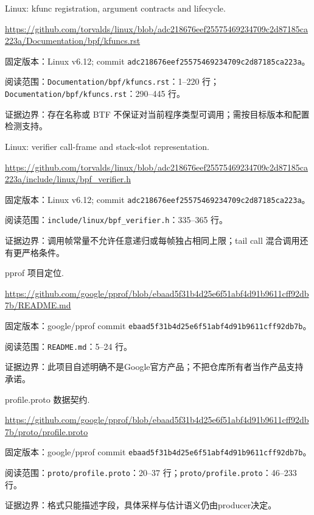 \documentclass[UTF8,fontset=fandol,openany,11pt]{ctexbook}
\begin{document}
\begin{thebibliography}{999}
 Linux: kfunc registration, argument contracts and lifecycle.\par
\url{https://github.com/torvalds/linux/blob/adc218676eef25575469234709c2d87185ca223a/Documentation/bpf/kfuncs.rst}\par
{\small\raggedright 固定版本：Linux v6.12; commit \texttt{adc21867\allowbreak{}6eef2557\allowbreak{}54692347\allowbreak{}09c2d871\allowbreak{}85ca223a}。\par
阅读范围：\nolinkurl{Documentation/bpf/kfuncs.rst}：1–220 行；\nolinkurl{Documentation/bpf/kfuncs.rst}：290–445 行。\par
证据边界：存在名称或 BTF 不保证对当前程序类型可调用；需按目标版本和配置检测支持。
}

 Linux: verifier call-frame and stack-slot representation.\par
\url{https://github.com/torvalds/linux/blob/adc218676eef25575469234709c2d87185ca223a/include/linux/bpf_verifier.h}\par
{\small\raggedright 固定版本：Linux v6.12; commit \texttt{adc21867\allowbreak{}6eef2557\allowbreak{}54692347\allowbreak{}09c2d871\allowbreak{}85ca223a}。\par
阅读范围：\nolinkurl{include/linux/bpf_verifier.h}：335–365 行。\par
证据边界：调用帧常量不允许任意递归或每帧独占相同上限；tail call 混合调用还有更严格条件。
}

 pprof 项目定位.\par
\url{https://github.com/google/pprof/blob/ebaad5f31b4d25e6f51abf4d91b9611cff92db7b/README.md}\par
{\small\raggedright 固定版本：google/pprof commit \texttt{ebaad5f3\allowbreak{}1b4d25e6\allowbreak{}f51abf4d\allowbreak{}91b9611c\allowbreak{}ff92db7b}。\par
阅读范围：\nolinkurl{README.md}：5–24 行。\par
证据边界：此项目自述明确不是Google官方产品；不把仓库所有者当作产品支持承诺。
}

 profile.proto 数据契约.\par
\url{https://github.com/google/pprof/blob/ebaad5f31b4d25e6f51abf4d91b9611cff92db7b/proto/profile.proto}\par
{\small\raggedright 固定版本：google/pprof commit \texttt{ebaad5f3\allowbreak{}1b4d25e6\allowbreak{}f51abf4d\allowbreak{}91b9611c\allowbreak{}ff92db7b}。\par
阅读范围：\nolinkurl{proto/profile.proto}：20–37 行；\nolinkurl{proto/profile.proto}：46–233 行。\par
证据边界：格式只能描述字段，具体采样与估计语义仍由producer决定。
}


\end{thebibliography}
\end{document}

